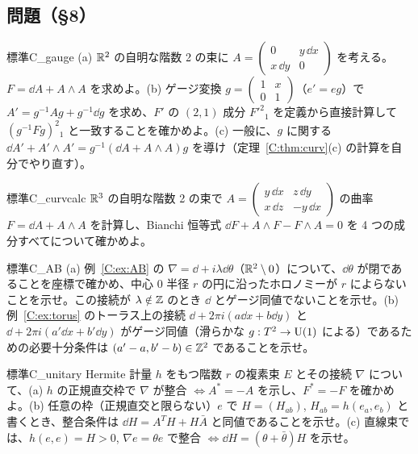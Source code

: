 \subsection*{問題（§8）}
\begin{probl}{標準}{C_gauge}
(a) $\mathbb R^2$ の自明な階数 2 の束に $A=\begin{pmatrix}0&y\,\dd x\\x\,\dd y&0\end{pmatrix}$ を考える。$F=\dd A+A\wedge A$ を求めよ。(b) ゲージ変換 $g=\begin{pmatrix}1&x\\0&1\end{pmatrix}$（$e'=eg$）で $A'=g^{-1}Ag+g^{-1}\dd g$ を求め、$F'$ の $(2,1)$ 成分 $F'^2{}_1$ を定義から直接計算して $(g^{-1}Fg)^2{}_1$ と一致することを確かめよ。(c) 一般に、$g$ に関する $\dd A'+A'\wedge A'=g^{-1}(\dd A+A\wedge A)g$ を導け（定理~\ref{C:thm:curv}(c) の計算を自分でやり直す）。
\end{probl}
\begin{probl}{標準}{C_curvcalc}
$\mathbb R^3$ の自明な階数 2 の束で $A=\begin{pmatrix}y\,\dd x&z\,\dd y\\x\,\dd z&-y\,\dd x\end{pmatrix}$ の曲率 $F=\dd A+A\wedge A$ を計算し、Bianchi 恒等式 $\dd F+A\wedge F-F\wedge A=0$ を 4 つの成分すべてについて確かめよ。
\end{probl}
\begin{probl}{標準}{C_AB}
(a) 例~\ref{C:ex:AB} の $\nabla=\dd+i\lambda\dd\theta$（$\mathbb R^2\setminus0$）について、$\dd\theta$ が閉であることを座標で確かめ、中心 $0$ 半径 $r$ の円に沿ったホロノミーが $r$ によらないことを示せ。この接続が $\lambda\notin\mathbb Z$ のとき $\dd$ とゲージ同値でないことを示せ。(b) 例~\ref{C:ex:torus} のトーラス上の接続 $\dd+2\pi i(a\dd x+b\dd y)$ と $\dd+2\pi i(a'\dd x+b'\dd y)$ がゲージ同値（滑らかな $g:T^2\to\mathrm{U}(1)$ による）であるための必要十分条件は $(a'-a,b'-b)\in\mathbb Z^2$ であることを示せ。
\end{probl}
\begin{probl}{標準}{C_unitary}
Hermite 計量 $h$ をもつ階数 $r$ の複素束 $E$ とその接続 $\nabla$ について、(a) $h$ の正規直交枠で $\nabla$ が整合 $\Leftrightarrow A^*=-A$ を示し、$F^*=-F$ を確かめよ。(b) 任意の枠（正規直交と限らない）$e$ で $H=(H_{ab})$, $H_{ab}=h(e_a,e_b)$ と書くとき、整合条件は $\dd H=A^TH+H\bar A$ と同値であることを示せ。(c) 直線束では、$h(e,e)=H>0$, $\nabla e=\theta e$ で整合 $\Leftrightarrow\dd H=(\theta+\bar\theta)H$ を示せ。
\end{probl}
